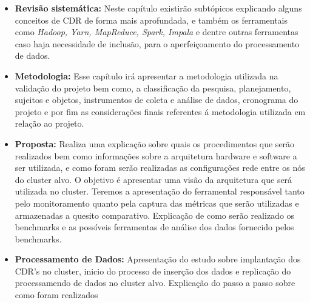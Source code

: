     \begin{itemize}
        \item \textbf{Revisão sistemática:} Neste capítulo existirão subtópicos explicando alguns conceitos de CDR de forma mais
                                                                    aprofundada, e também os ferramentais como \textit{Hadoop, Yarn, MapReduce, Spark,
                                                                    Impala} e dentre outras ferramentas caso haja necessidade de inclusão, para o
                                                                    aperfeiçoamento do processamento de dados.
        \item \textbf{Metodologia:} Esse capítulo irá apresentar a metodologia utilizada na validação do projeto bem como,
                                                       a classificação da pesquisa, planejamento, sujeitos e objetos, instrumentos de coleta e
                                                       análise de dados, cronograma do projeto e por fim as considerações finais referentes á
                                                       metodologia utilizada em relação ao projeto.
        \item \textbf{Proposta: } Realiza uma explicação sobre quais os procedimentos que serão realizados bem como
                                                  informações sobre a arquitetura hardware e software a ser utilizada, e como foram serão
                                                  realizadas as configurações rede entre os nós do cluster alvo. O objetivo é apresentar uma visão da
                                                  arquitetura que será utilizada no cluster. Teremos a apresentação do ferramental responsável
                                                  tanto pelo monitoramento quanto pela captura das métricas que serão utilizadas e armazenadas
                                                  a quesito comparativo. Explicação de como serão realizado os benchmarks e as possíveis
                                                  ferramentas de análise dos dados fornecido pelos benchmarks.
        \item \textbf{Processamento de Dados:} Apresentação do estudo sobre implantação dos CDR's no cluster, inicio do
                                                                            processo de inserção dos dados e replicação do processamendo de dados
                                                                            no cluster alvo. Explicação do passo a passo sobre como foram realizados

\end{itemize}
